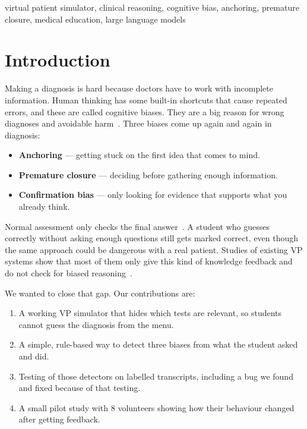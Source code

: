 \documentclass[conference]{IEEEtran}
\begin{document}
\begin{IEEEkeywords}
virtual patient simulator, clinical reasoning, cognitive bias, anchoring,
premature closure, medical education, large language models
\end{IEEEkeywords}

\section{Introduction}
Making a diagnosis is hard because doctors have to work with incomplete
information. Human thinking has some built-in shortcuts that cause repeated
errors, and these are called cognitive biases. They are a big reason for wrong
diagnoses and avoidable harm~\cite{croskerry2003, graber2005}. Three biases come
up again and again in diagnosis:

\begin{itemize}
  \item \textbf{Anchoring} --- getting stuck on the first idea that comes to mind.
  \item \textbf{Premature closure} --- deciding before gathering enough
  information.
  \item \textbf{Confirmation bias} --- only looking for evidence that supports
  what you already think.
\end{itemize}

Normal assessment only checks the final answer~\cite{norman2010, greengrass2026}.
A student who guesses correctly without asking enough questions still gets marked
correct, even though the same approach could be dangerous with a real patient.
Studies of existing VP systems show that most of them only give this kind of
knowledge feedback and do not check for biased reasoning~\cite{vpsurvey}.

We wanted to close that gap. Our contributions are:

\begin{enumerate}
  \item A working VP simulator that hides which tests are relevant, so students
  cannot guess the diagnosis from the menu.
  \item A simple, rule-based way to detect three biases from what the student
  asked and did.
  \item Testing of those detectors on labelled transcripts, including a bug we
  found and fixed because of that testing.
  \item A small pilot study with 8 volunteers showing how their behaviour
  changed after getting feedback.
\end{enumerate}
\end{document}
